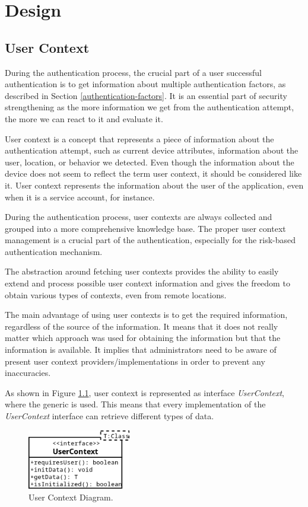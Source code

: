 \chapter{Design}

\section{User Context}
During the authentication process, the crucial part of a user successful authentication is to get information about multiple authentication factors, as described in Section \ref{authentication-factors}.
It is an essential part of security strengthening as the more information we get from the authentication attempt, the more we can react to it and evaluate it.

User context is a concept that represents a piece of information about the authentication attempt, such as current device attributes, information about the user, location, or behavior we detected.
Even though the information about the device does not seem to reflect the term user context, it should be considered like it.
User context represents the information about the user of the application, even when it is a service account, for instance.

During the authentication process, user contexts are always collected and grouped into a more comprehensive knowledge base.
The proper user context management is a crucial part of the authentication, especially for the risk-based authentication mechanism.

The abstraction around fetching user contexts provides the ability to easily extend and process possible user context information and gives the freedom to obtain various types of contexts, even from remote locations.

The main advantage of using user contexts is to get the required information, regardless of the source of the information.
It means that it does not really matter which approach was used for obtaining the information but that the information is available.
It implies that administrators need to be aware of present user context providers/implementations in order to prevent any inaccuracies.

As shown in Figure \ref{fig:user-context-diagram}, user context is represented as interface \textit{UserContext}, where the generic is used.
This means that every implementation of the \textit{UserContext} interface can retrieve different types of data.

\begin{figure}[htbp]
  \centering
  \includegraphics[width=0.4\textwidth]{img/sections/5-design/userContext.png}
  \caption{User Context Diagram.}
  \label{fig:user-context-diagram}
\end{figure}

